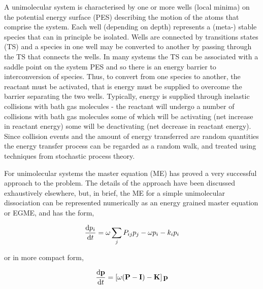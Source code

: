 A unimolecular system is characterised by one or more wells (local minima) on the potential energy surface (PES) describing the motion of the atoms that comprise the system. Each well (depending on depth) represents a (meta-) stable species that can in principle be isolated. Wells are connected by transitions states (TS) and a species in one well may be converted to another by passing through the TS that connects the wells. In many systems the TS can be associated with a saddle point on the system PES and so there is an energy barrier to interconversion of species. Thus, to convert from one species to another, the reactant must be activated, that is energy must be supplied to overcome the barrier separating the two wells. Typically, energy is supplied through inelastic collisions with bath gas molecules - the reactant will undergo a number of collisions with bath gas molecules some of which will be activating (net increase in reactant energy) some will be deactivating (net decrease in reactant energy).  Since collision events and the amount of energy transferred are random quantities the energy transfer process can be regarded as a random walk, and treated using techniques from stochastic process theory.

For unimolecular systems the master equation (ME) has proved a very successful approach to the problem. The details of the approach have been discussed exhaustively elsewhere, but, in brief, the ME for a simple unimolecular dissociation can be represented numerically as an energy grained master equation or EGME, and has the form,


\begin{equation}
\frac{{{\rm d}p_i }}{{{\rm d}t}} = \omega \sum\limits_j {P_{ij} p_j }  - \omega p_i  - k_i p_i 
\end{equation}

or in more compact form,

\begin{equation}
\frac{{{\rm d}{\bf p}}}{{{\rm d}t}} = \left[ {\omega ({\bf P} - {\bf I}) - {\bf K}} \right]{\bf p}
\end{equation}

